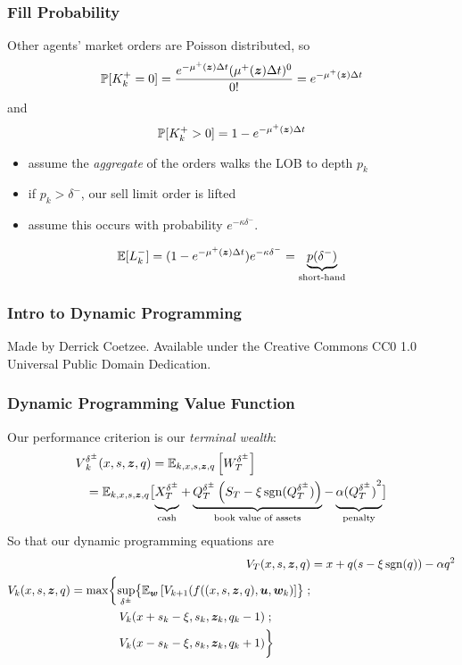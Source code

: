 \begin{frame}
\frametitle{Fill Probability}
Other agents' market orders are Poisson distributed, so
\[ \mathbb{P} [ K_k^+ = 0] = \frac{e^{-\mu^+ (\bm{z}) \Delta t} (\mu^+ (\bm{z}) \Delta t)^0}{0!} = e^{-\mu^+ (\bm{z}) \Delta t} \]
and
\[ \mathbb{P} [ K_k^+ > 0] = 1 - e^{-\mu^+ (\bm{z}) \Delta t} \]
\begin{itemize}
\item assume the \textit{aggregate} of the orders walks the LOB to depth $p_k$
\item if $p_k > \delta^-$, our sell limit order is lifted
\item assume this occurs with probability $e^{-\kappa \delta^-}$.
\end{itemize}
\[ \mathbb{E} [ L_k^- ] = ( 1 - e^{-\mu^+ (\bm{z}) \Delta t} ) e^{-\kappa \delta^-} = \underbrace{p(\delta^-)}_{\text{short-hand}} \]
\end{frame}

\begin{frame}
\frametitle{Intro to Dynamic Programming}
{\tiny Made by Derrick Coetzee. Available under the Creative Commons CC0 1.0 Universal Public Domain Dedication.}
\end{frame}

\begin{frame}
\frametitle{Dynamic Programming Value Function}
Our performance criterion is our \emph{terminal wealth}:
\[
\begin{aligned}
V&_k^{\delta^\pm} (x,s,\bz,q) = \E_{k,x,s,\bz,q} \left[ W_T^{\delta^\pm} \right] \\ 
& = \E_{k,x,s,\bz,q}\bigl[ 
\underbrace{\vphantom{\left( Q^{\btau, \delta}_t) \right)} X_T^{\delta^\pm}}_{\text{cash}}+ \underbrace{Q_T^{\delta^\pm}\left(S_T - \xi\sgn(Q_T^{\delta^\pm})\right)}_{\text{book value of assets}} - \underbrace{\vphantom{\left( Q^{\btau, \delta}_t) \right)}\alpha {(Q_T^{\delta^\pm})}^2}_{\text{penalty}} \bigr]
\end{aligned}
\]
So that our dynamic programming equations are
\begin{align*}
V_T (x,s,\bz,q) & = x + q(s-\xi\sgn(q)) - \alpha q^2 \\
\begin{split}
V_k (x,s,\bz,q) & = \max \biggl\lbrace \sup_{\delta^\pm} \bigl\lbrace \E_{\bw} \left[ V_{k+1} (f((x,s,\bz,q),\bu,\bw_k) \right] \bigr\rbrace \; ; \\
& \hphantom{{}={} \max \biggl\lbrace} V_k(x+s_k-\xi,s_k, \bz_k, q_k -1) \; ; \\
& \hphantom{{}={} \max \biggl\lbrace} V_k(x-s_k-\xi,s_k, \bz_k, q_k +1) \biggr\rbrace
\end{split}
\end{align*}
\end{frame}

